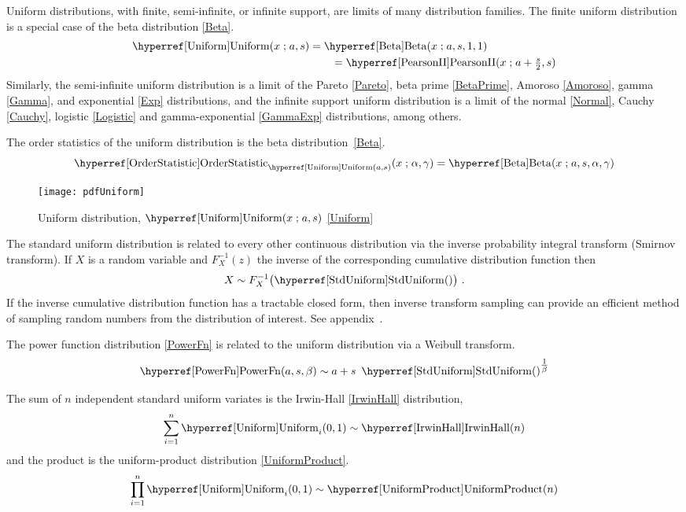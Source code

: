 Uniform distributions, with finite, semi-infinite, or infinite support, are limits of many distribution families. The finite uniform distribution is a special case of the beta distribution \eqref{Beta}.
\begin{align*}
 \opr{Uniform}(x\given a,s)  &=  \opr{Beta}(x\given a, s, 1,1) 	\checked
 \\
 &\qquad=  \opr{PearsonII}(x\given a+\tfrac{s}{2}, s)
\end{align*}
Similarly, the semi-infinite uniform distribution is a limit of the Pareto \eqref{Pareto}, beta prime \eqref{BetaPrime}, Amoroso \eqref{Amoroso}, gamma \eqref{Gamma}, and exponential  \eqref{Exp} distributions, and the infinite support uniform distribution is a limit of the normal \eqref{Normal}, Cauchy \eqref{Cauchy}, logistic \eqref{Logistic} and  gamma-exponential  \eqref{GammaExp} distributions, among others. 

The order statistics  of the uniform distribution is the beta distribution~\eqref{Beta}.
\[
\opr{OrderStatistic}_{\opr{Uniform}(a,s)}(x \given \alpha, \gamma) =  \opr{Beta}(x\given a, s, \alpha, \gamma) 
\checked
\]


\begin{figure}[t]
\begin{center}
\texttt{[image: pdfUniform]}
\end{center}
\caption[Uniform distribution]{Uniform distribution, $\opr{Uniform}(x\given a,s)$ \eqref{Uniform}}
\end{figure}


The standard uniform distribution is related to every other continuous distribution via the  inverse probability integral transform (Smirnov transform). If $X$ is a random variable and $F_X^{-1}(z)$ the inverse of the corresponding cumulative distribution function then 
\[ 
X \sim F_X^{-1}\bigl( \opr{StdUniform}() \bigr) \ .  \checked
\]
If the inverse cumulative distribution function has a tractable closed form, then inverse transform sampling can provide an efficient method of sampling random numbers from the distribution of interest. See appendix~.

The power function distribution \eqref{PowerFn} is related to the uniform distribution via a Weibull transform.
\[
\opr{PowerFn}(a,s,\beta) \sim a + s\ \opr{StdUniform}()^{\tfrac{1}{\beta}}  \checked
\]

The sum of $n$ independent standard uniform variates is the  Irwin-Hall \eqref{IrwinHall} distribution,
\[
\sum_{i=1}^{n} \opr{Uniform}_i(0,1)  \sim \opr{IrwinHall}(n) \checked
\]
and the product is the uniform-product distribution \eqref{UniformProduct}.
\[
\prod_{i=1}^{n} \opr{Uniform}_i(0,1)  \sim \opr{UniformProduct}(n) \checked
\]




